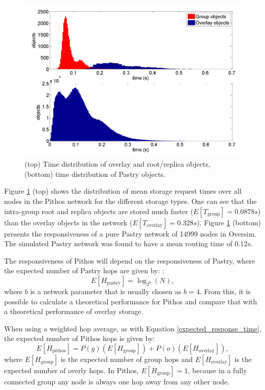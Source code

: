 \documentclass[10pt,a4paper,conference]{IEEEtran}
\begin{document}
\begin{figure}[htbp]
 \centering
 \includegraphics[clip=true, viewport=1cm 0.5cm 29cm 20.5cm, width=\columnwidth]{StoreTimes}
 \caption{(top) Time distribution of overlay and root/replica objects, (bottom) time distribution of Pastry objects.}
 \label{fig_pithos_response}
\end{figure}
%
Figure \ref{fig_pithos_response} (top) shows the distribution of mean storage request times over all nodes in the Pithos network for the different
storage types. One can see that the intra-group root and replica objects are stored much faster ($E\left[T_{\textrm{group}}\right] = 0.0878s$) than
the overlay objects in the network ($E\left[T_{\textrm{overlay}}\right] = 0.328s$). Figure \ref{fig_pithos_response} (bottom) presents the
responsiveness of a pure Pastry network of 14999 nodes in Oversim. The simulated Pastry network was found to have a mean routing time of $0.12s$.

The responsiveness of Pithos will depend on the responsiveness of Pastry, where the expected number of Pastry hops are given by:
\cite{storage_and_chaching_PAST}:
%
\begin{equation}\label{pastry_hops}
    E[H_{\textrm{pastry}}] = \log_{2^b}\left(N\right),
\end{equation}
%
where $b$ is a network parameter that is usually chosen as $b = 4$. From this, it is possible to calculate a theoretical performance for Pithos and
compare that with a theoretical performance of overlay storage.

When using a weighted hop average, as with Equation \eqref{expected_response_time}, the expected number of Pithos hops is given by:
%
\begin{equation}\label{expected_response_time}
    E[H_{\textrm{pithos}}] = P(g)\left(E\left[H_{\textrm{group}}\right]\right) + P(o)\left(E\left[H_{\textrm{overlay}}\right]\right),
\end{equation}
%
where $E\left[H_{\textrm{group}}\right]$ is the expected number of group hops and $E\left[H_{\textrm{overlay}}\right]$ is the expected number of
overly hops. In Pithos, $E\left[H_{\textrm{group}}\right] = 1$, because in a fully connected group any node is always one hop away from any other
node.
\end{document}
